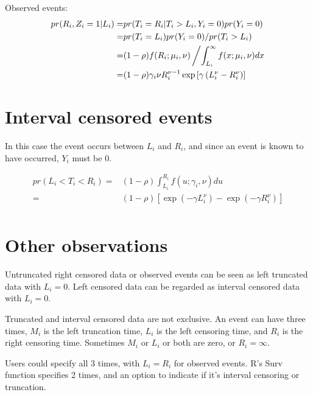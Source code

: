 \documentclass{article}
\begin{document}
Observed events:
\begin{align*}
pr(R_i, Z_i=1 | L_i) =& pr(T_i = R_i | T_i > L_i, Y_i =0)  pr(Y_i = 0) 
\\
=& 
 pr(T_i = L_i) pr(Y_i = 0) /pr(T_i > L_i) \\
=&
 (1-\rho) f(R_i ; \mu_i, \nu) \left/ \int_{L_i}^\infty f(x;\mu_i, \nu) dx  \right.\\
=&
 (1-\rho) \gamma_i\nu R_i^{\nu-1} \exp\left[\gamma\left(L_i^\nu-R_i^\nu\right)\right]
\end{align*}

\section{Interval censored events}

In this case the event occurs between $L_i$ and $R_i$, and since an event is known to have occurred, $Y_i$ must be 0.   

\begin{align*}
pr(L_i < T_i < R_i ) =& (1-\rho) \int_{L_i}^{R_i}f(u;\gamma_i, \nu) du 
\\
=& (1-\rho) \left[ \exp(-\gamma L_i^\nu) -  \exp(-\gamma R_i^\nu)\right]
\\
\end{align*}

\section{Other observations}
Untruncated right censored data or observed events can be seen as left truncated data with $L_i= 0$.  Left censored data can be regarded as interval censored data with $L_i = 0$.

Truncated and interval censored data are not exclusive.  An event can have three times, $M_i$ is the left truncation time, $L_i$ is the left censoring time, and $R_i$ is the right censoring time. Sometimes $M_i$ or $L_i$ or both are zero, or $R_i = \infty$.  

Users could specify all 3 times, with $L_i =R_i$ for observed events.  R's Surv function specifies 2 times, and an option to indicate if it's interval censoring or  truncation.  
 
\end{document}
